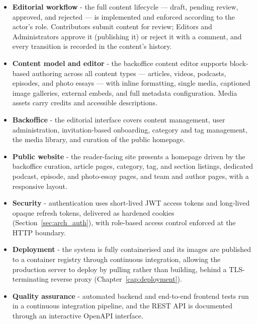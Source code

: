 \begin{itemize}
      \item \textbf{Editorial workflow} - the full content lifecycle --- draft, pending
            review, approved, and rejected --- is implemented and enforced according
            to the actor's role. Contributors submit content for review; Editors and
            Administrators approve it (publishing it) or reject it with a
            comment, and every transition is recorded in the content's history.

      \item \textbf{Content model and editor} - the backoffice content editor supports
            block-based authoring across all content types --- articles, videos,
            podcasts, episodes, and photo essays --- with inline formatting, single media,
            captioned image galleries, external embeds, and full metadata configuration.
            Media assets carry credits and accessible descriptions.

      \item \textbf{Backoffice} - the editorial interface covers content management, user
            administration, invitation-based onboarding, category and tag management, the
            media library, and curation of the public homepage.

      \item \textbf{Public website} - the reader-facing site presents a homepage driven by
            the backoffice curation, article pages, category, tag, and section listings,
            dedicated podcast, episode, and photo-essay pages, and team and author pages,
            with a responsive layout.

      \item \textbf{Security} - authentication uses short-lived JWT access tokens and
            long-lived opaque refresh tokens, delivered as hardened cookies
            (Section~\ref{sec:arch_auth}), with role-based access control enforced at the
            HTTP boundary.

      \item \textbf{Deployment} - the system is fully containerised and its images are
            published to a container registry through continuous integration, allowing
            the production server to deploy by pulling rather than building, behind a
            TLS-terminating reverse proxy (Chapter~\ref{cap:deployment}).

      \item \textbf{Quality assurance} - automated backend and end-to-end frontend tests
            run in a continuous integration pipeline, and the REST API is documented
            through an interactive OpenAPI interface.
\end{itemize}

